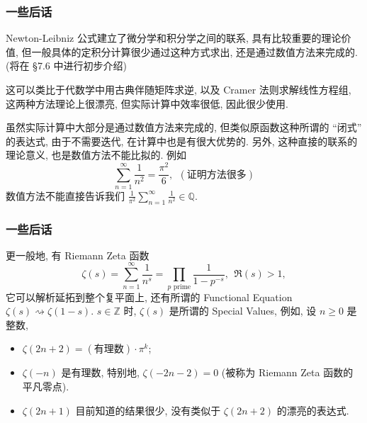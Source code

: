 \begin{frame}
\frametitle{一些后话}

Newton-Leibniz 公式建立了微分学和积分学之间的联系, 具有比较重要的理论价值, 但一般具体的定积分计算很少通过这种方式求出, 还是通过数值方法来完成的. (将在 \S 7.6 中进行初步介绍)

\pause
\vspace{0.5em}

这可以类比于代数学中用古典伴随矩阵求逆, 以及 Cramer 法则求解线性方程组, 这两种方法理论上很漂亮, 但实际计算中效率很低, 因此很少使用.

\pause
\vspace{0.5em}

虽然实际计算中大部分是通过数值方法来完成的, 但类似原函数这种所谓的 ``闭式'' 的表达式, 由于不需要迭代, 在计算中也是有很大优势的. 另外, 这种直接的联系的理论意义, 也是数值方法不能比拟的. 例如
\[
\sum_{n=1}^\infty \frac{1}{n^2} = \frac{\pi^2}{6}, ~~ (\text{证明方法很多})
\]
数值方法不能直接告诉我们 $\frac{1}{\pi^2} \sum\limits_{n=1}^\infty \frac{1}{n^2} \in \mathbb{Q}.$


\end{frame}


\begin{frame}
\frametitle{一些后话}

更一般地, 有 Riemann Zeta 函数
\[
\zeta(s) = \sum_{n=1}^\infty \frac{1}{n^s} = \prod_{p \text{ prime}} \frac{1}{1 - p^{-s}}, ~~ \Re(s) > 1,
\]
它可以解析延拓到整个复平面上, 还有所谓的 Functional Equation $\zeta(s) \rightsquigarrow \zeta(1-s)$. $s \in \mathbb{Z}$ 时, $\zeta(s)$ 是所谓的 Special Values, 例如, 设 $n \geqslant 0$ 是整数,
\begin{itemize}
\item $\zeta(2n + 2) = (\text{有理数}) \cdot \pi^{k}$;
\item $\zeta(-n)$ 是有理数, 特别地, $\zeta(-2n - 2) = 0$ (被称为 Riemann Zeta 函数的平凡零点).
\item $\zeta(2n + 1)$ 目前知道的结果很少, 没有类似于 $\zeta(2n + 2)$ 的漂亮的表达式.
\end{itemize}

\end{frame}



